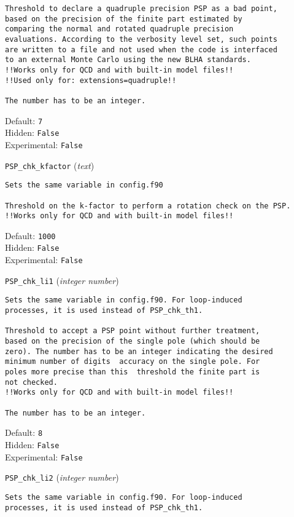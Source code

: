 \begin{basedescript}{\desclabelstyle{\pushlabel}}
\begin{verbatim}
Threshold to declare a quadruple precision PSP as a bad point,
based on the precision of the finite part estimated by
comparing the normal and rotated quadruple precision
evaluations. According to the verbosity level set, such points
are written to a file and not used when the code is interfaced
to an external Monte Carlo using the new BLHA standards.
!!Works only for QCD and with built-in model files!!
!!Used only for: extensions=quadruple!!

The number has to be an integer.
\end{verbatim}
Default: \verb|7|
\\Hidden: \verb|False|
\\Experimental: \verb|False|
\\\item[\colorbox{gray!30}{\texttt{PSP\_chk\_kfactor}}] (\textit{text})
\begin{verbatim}
Sets the same variable in config.f90

Threshold on the k-factor to perform a rotation check on the PSP.
!!Works only for QCD and with built-in model files!!
\end{verbatim}
Default: \verb|1000|
\\Hidden: \verb|False|
\\Experimental: \verb|False|
\\\item[\colorbox{gray!30}{\texttt{PSP\_chk\_li1}}] (\textit{integer number})
\begin{verbatim}
Sets the same variable in config.f90. For loop-induced
processes, it is used instead of PSP_chk_th1.

Threshold to accept a PSP point without further treatment,
based on the precision of the single pole (which should be
zero). The number has to be an integer indicating the desired
minimum number of digits  accuracy on the single pole. For
poles more precise than this  threshold the finite part is
not checked.
!!Works only for QCD and with built-in model files!!

The number has to be an integer.
\end{verbatim}
Default: \verb|8|
\\Hidden: \verb|False|
\\Experimental: \verb|False|
\\\item[\colorbox{gray!30}{\texttt{PSP\_chk\_li2}}] (\textit{integer number})
\begin{verbatim}
Sets the same variable in config.f90. For loop-induced
processes, it is used instead of PSP_chk_th1.


\end{verbatim}
\end{basedescript}
